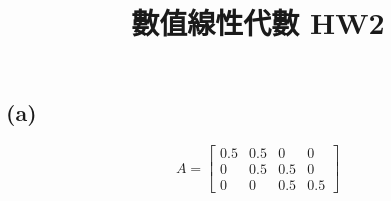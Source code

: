 \documentclass[12pt]{article}
\title{數值線性代數 HW2}
\begin{document}
\maketitle
\section{}
\section{}
\section{}
    \subsection*{(a)}
    \[  A=
        \left[
        \begin{array}{cccc}
            0.5 & 0.5 & 0 & 0\\
            0 & 0.5 & 0.5 & 0\\
            0 & 0 & 0.5 & 0.5
        \end{array}
        \right]
    \]
\end{document}
